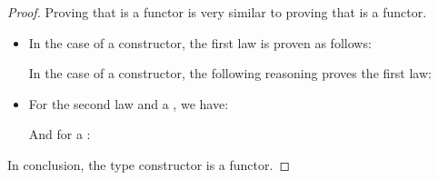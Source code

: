 \begin{example}
\begin{proof}
    Proving that  is a functor is very similar to
    proving that  is a functor.
    \begin{itemize}
    \item
      In the case of a  constructor, the first law is
      proven as follows:
      \begin{steps}
      \end{steps}
      In the case of a  constructor, the following
      reasoning proves the first law:
      \begin{steps}
      \end{steps}
    \item
      For the second law and a , we have:
      \begin{steps}
      \end{steps}
      And for a :
      \begin{steps}
      \end{steps}
    \end{itemize}
    In conclusion, the  type constructor is a
    functor.

  \end{proof}

\end{example}

